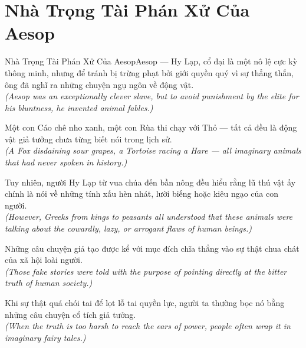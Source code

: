\section{Nhà Trọng Tài Phán Xử Của Aesop}
\begin{truyen}{Nhà Trọng Tài Phán Xử Của Aesop}{Aesop --- Hy Lạp, cổ đại}
 là một nô lệ cực kỳ thông minh, nhưng để tránh bị trừng phạt bởi giới quyền quý vì sự thẳng thắn, ông đã nghĩ ra những chuyện ngụ ngôn về động vật.\\[4pt]
\textit{(Aesop was an exceptionally clever slave, but to avoid punishment by the elite for his bluntness, he invented animal fables.)}

Một con Cáo chê nho xanh, một con Rùa thi chạy với Thỏ --- tất cả đều là động vật giả tưởng chưa từng biết nói trong lịch sử.\\[4pt]
\textit{(A Fox disdaining sour grapes, a Tortoise racing a Hare --- all imaginary animals that had never spoken in history.)}

Tuy nhiên, người Hy Lạp từ vua chúa đến bần nông đều hiểu rằng lũ thú vật ấy chính là nói về những tính xấu hèn nhát, lười biếng hoặc kiêu ngạo của con người.\\[4pt]
\textit{(However, Greeks from kings to peasants all understood that these animals were talking about the cowardly, lazy, or arrogant flaws of human beings.)}

Những câu chuyện giả tạo được kể với mục đích chĩa thẳng vào sự thật chua chát của xã hội loài người.\\[4pt]
\textit{(Those fake stories were told with the purpose of pointing directly at the bitter truth of human society.)}

\end{truyen}
\begin{baihoc}
  Khi sự thật quá chói tai để lọt lỗ tai quyền lực, người ta thường bọc nó bằng những câu chuyện cổ tích giả tưởng.\\[4pt]
  \textit{(When the truth is too harsh to reach the ears of power, people often wrap it in imaginary fairy tales.)}
\end{baihoc}

